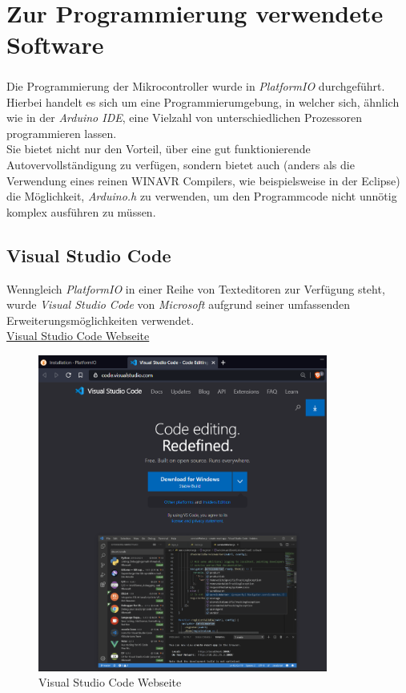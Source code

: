 \section{Zur Programmierung verwendete Software}
Die Programmierung der Mikrocontroller wurde in \textit{PlatformIO}\textsuperscript{\cite{PlatformIO}} durchgeführt. 
Hierbei handelt es sich um eine Programmierumgebung, in welcher sich, ähnlich wie in der \textit{Arduino IDE}, eine Vielzahl von unterschiedlichen Prozessoren programmieren lassen.\\
Sie bietet nicht nur den Vorteil, über eine gut funktionierende Autovervollständigung zu verfügen, sondern bietet auch (anders als die Verwendung eines reinen WINAVR Compilers, wie beispielsweise in der Eclipse) die Möglichkeit, \textit{Arduino.h} zu verwenden, 
um den Programmcode nicht unnötig komplex ausführen zu müssen.

\newpage

\subsection{Visual Studio Code} 
Wenngleich \textit{PlatformIO} in einer Reihe von Texteditoren zur Verfügung steht, wurde \textit{Visual Studio Code} von \textit{Microsoft} aufgrund seiner umfassenden Erweiterungsmöglichkeiten verwendet.\\
\href{https://code.visualstudio.com/}{Visual Studio Code Webseite}
\begin{figure}[h]
	\centering
	\includegraphics[width=0.85\textwidth]{bilder/Webseite_VSCode.png}
	\caption{Visual Studio Code Webseite}
\end{figure}

